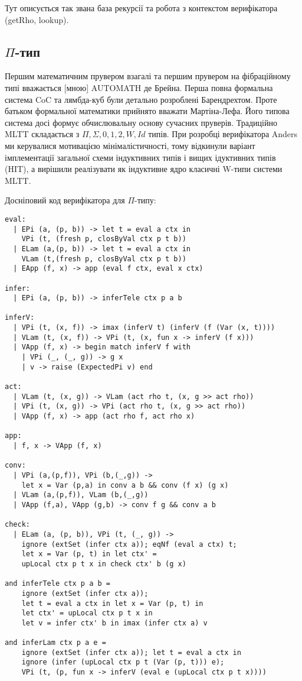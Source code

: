 Тут описується так звана база рекурсії та робота з
контекстом верифікатора (getRho, lookup).

\subsection*{$\Pi$-тип}

Першим математичним прувером взагалі та першим прувером
на фібраційному типі вважається [мною] AUTOMATH де Брейна. Перша
повна формальна система CoC та лямбда-куб були детально розроблені
Барендрехтом. Проте батьком формальної математики прийнято вважати
Мартіна-Лефа. Його типова система досі формує обчислювальну основу
сучасних пруверів. Традиційно MLTT складається з $\Pi, \Sigma, 0, 1, 2, W, Id$ типів.
При розробці верифікатора Anders ми керувалися мотивацією мінімалістичності,
тому відкинули варіант імплементації загальної схеми індуктивних типів і
вищих ідуктивних типів (HIT), а вирішили реалізувати як індуктивне
ядро класичні W-типи системи MLTT.

\newpage
Досніповий код верифікатора для $\Pi$-типу:
\begin{lstlisting}
eval:
  | EPi (a, (p, b)) -> let t = eval a ctx in
    VPi (t, (fresh p, closByVal ctx p t b))
  | ELam (a,(p, b)) -> let t = eval a ctx in
    VLam (t,(fresh p, closByVal ctx p t b))
  | EApp (f, x) -> app (eval f ctx, eval x ctx)

infer:
  | EPi (a, (p, b)) -> inferTele ctx p a b

inferV:
  | VPi (t, (x, f)) -> imax (inferV t) (inferV (f (Var (x, t))))
  | VLam (t, (x, f)) -> VPi (t, (x, fun x -> inferV (f x)))
  | VApp (f, x) -> begin match inferV f with
    | VPi (_, (_, g)) -> g x
    | v -> raise (ExpectedPi v) end

act:
  | VLam (t, (x, g)) -> VLam (act rho t, (x, g >> act rho))
  | VPi (t, (x, g)) -> VPi (act rho t, (x, g >> act rho))
  | VApp (f, x) -> app (act rho f, act rho x)

app:
  | f, x -> VApp (f, x)

conv:
  | VPi (a,(p,f)), VPi (b,(_,g)) ->
    let x = Var (p,a) in conv a b && conv (f x) (g x)
  | VLam (a,(p,f)), VLam (b,(_,g))
  | VApp (f,a), VApp (g,b) -> conv f g && conv a b

check:
  | ELam (a, (p, b)), VPi (t, (_, g)) ->
    ignore (extSet (infer ctx a)); eqNf (eval a ctx) t;
    let x = Var (p, t) in let ctx' =
    upLocal ctx p t x in check ctx' b (g x)

and inferTele ctx p a b =
    ignore (extSet (infer ctx a));
    let t = eval a ctx in let x = Var (p, t) in
    let ctx' = upLocal ctx p t x in
    let v = infer ctx' b in imax (infer ctx a) v

and inferLam ctx p a e =
    ignore (extSet (infer ctx a)); let t = eval a ctx in
    ignore (infer (upLocal ctx p t (Var (p, t))) e);
    VPi (t, (p, fun x -> inferV (eval e (upLocal ctx p t x))))
\end{lstlisting}

